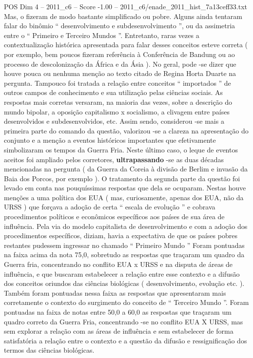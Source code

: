 \begin{textsample}{POS Dim 4 – 2011\_c6 – Score -1.00 – 2011\_c6/enade\_2011\_hist\_7a13ceff33.txt}
Mas, o fizeram de modo bastante simplificado ou pobre.
Alguns ainda tentaram falar do binômio “ desenvolvimento e subdesenvolvimento ”, ou da assimetria entre o “ Primeiro e Terceiro Mundos ”.
Entretanto, raras vezes a contextualização histórica apresentada para falar desses conceitos esteve correta ( por exemplo, bem poucos fizeram referência à Conferência de Bandung ou ao processo de descolonização da África e da Ásia ).
No geral, pode -se dizer que houve pouca ou nenhuma menção ao texto citado de Regina Horta Duarte na pergunta.
Tampouco foi tratada a relação entre conceitos “ importados ” de outros campos de conhecimento e sua utilização pelas ciências sociais.
As respostas mais corretas versaram, na maioria das vezes, sobre a descrição do mundo bipolar, a oposição capitalismo x socialismo, a clivagem entre países desenvolvidos e subdesenvolvidos, etc.
Assim sendo, considerou -se mais a primeira parte do comando da questão, valorizou -se a clareza na apresentação do conjunto e a menção a eventos históricos importantes que efetivamente simbolizaram os tempos da Guerra Fria.
Neste último caso, o leque de eventos aceitos foi ampliado pelos corretores, \textbf{ultrapassando} -se as duas décadas mencionadas na pergunta ( da Guerra da Coreia à divisão de Berlim e invasão da Baia dos Porcos, por exemplo ).
O tratamento da segunda parte da questão foi levado em conta nas pouquíssimas respostas que dela se ocuparam.
Nestas houve menções a uma política dos EUA ( mas, curiosamente, apenas dos EUA, não da URSS ) que forçava a adoção de certa “ escala de evolução ” e cobrava procedimentos políticos e econômicos específicos aos países de sua área de influência.
Pela via do modelo capitalista de desenvolvimento e com a adoção dos procedimentos específicos, diziam, havia a expectativa de que os países pobres restantes pudessem ingressar no chamado “ Primeiro Mundo ” Foram pontuadas na faixa acima da nota 75,0, sobretudo as respostas que traçaram um quadro da Guerra fria, concentrando no conflito EUA x URSS e na disputa de áreas de influência, e que buscaram estabelecer a relação entre esse contexto e a difusão dos conceitos oriundos das ciências biológicas ( desenvolvimento, evolução etc. ).
Também foram pontuadas nessa faixa as respostas que apresentaram mais corretamente o contexto do surgimento do conceito de “ Terceiro Mundo ”.
Foram pontuadas na faixa de notas entre 50,0 a 60,0 as respostas que traçaram um quadro correto da Guerra Fria, concentrando -se no conflito EUA X URSS, mas sem explorar a relação com as áreas de influência e sem estabelecer de forma satisfatória a relação entre o contexto e a questão da difusão e ressignificação dos termos das ciências biológicas.

\end{textsample}

